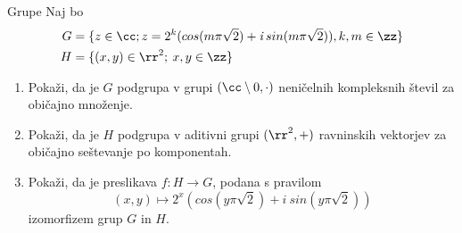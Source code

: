 \begin{frame}{Grupe}
	Naj bo
	\begin{align*}
			 G & = \{z \in \cc; z = 2^k(cos(m\pi\sqrt{2}) + \textit{i} \: sin(m\pi\sqrt{2})), k,m \in \zz \} \\
			 H & = \{(x,y) \in \rr^2; \: x,y \in \zz\}
	\end{align*}

	\begin{enumerate}
		\item
			Pokaži, da je $G$ podgrupa v grupi $ (\cc \setminus {0},\cdot)$
			neničelnih kompleksnih števil za običajno množenje.
		\item
			Pokaži, da je $H$ podgrupa v aditivni grupi $ (\rr^2, +)$
			ravninskih vektorjev za običajno seštevanje po komponentah.
		\item
			Pokaži, da je preslikava $f:H\to G$, podana s pravilom
			\[
				(x,y) \mapsto 2^x(cos(y\pi\sqrt{2}) + \textit{i} \: sin(y\pi\sqrt{2}))
			\]
			izomorfizem grup $G$ in $H$.
	\end{enumerate}
\end{frame}
